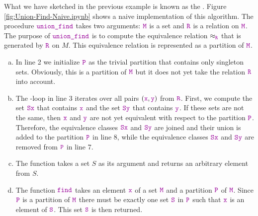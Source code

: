 What we have sketched in the previous example is known as the .
Figure \ref{fig:Union-Find-Naive.ipynb} shows a naive implementation of this algorithm.  The
procedure $\mytt{union\_find}$ takes two arguments: $\mytt{M}$ is a set and $\mytt{R}$ is a relation
on $\mytt{M}$.  The purpose of $\mytt{union\_find}$ is to compute the equivalence relation $\approx_\mytt{R}$
that is generated by $\mytt{R}$ on $M$.  This equivalence relation is represented as a partition of $\mytt{M}$.
\begin{enumerate}[(a)]
\item In line 2 we initialize $\mytt{P}$ as the trivial partition that contains only singleton
      sets.  Obviously, this is a partition of $\mytt{M}$ but it does not yet take the
      relation $\mytt{R}$ into account.
\item The -loop in line 3 iterates over all pairs $(\mytt{x},\mytt{y})$ from $\mytt{R}$.
      First, we compute the set $\mytt{Sx}$ that contains $\mytt{x}$ and the set $\mytt{Sy}$ that
      contains $\mytt{y}$.  If these sets are not the same, then $\mytt{x}$ and $\mytt{y}$ are not
      yet equivalent with respect to the partition $\mytt{P}$.  Therefore, the equivalence classes
      $\mytt{Sx}$ and $\mytt{Sy}$ are joined and their union is added to the partition 
      $\mytt{P}$ in line 8, while the equivalence classes $\mytt{Sx}$ and $\mytt{Sy}$ are
      removed from $\mytt{P}$ in line 7.
\item The function  takes a set $S$ as its argument and returns an
      arbitrary element from $S$. 
\item The function $\mytt{find}$ takes an element $\mytt{x}$ of a set $\mytt{M}$ and a partition
      $\mytt{P}$ of $\mytt{M}$.  Since $\mytt{P}$ is a partition of $\mytt{M}$ there must be exactly
      one set $\mytt{S}$ in $\mytt{P}$ such that $\mytt{x}$ is an element of $\mytt{S}$.  This set
      $\mytt{S}$ is then returned.
\end{enumerate}

